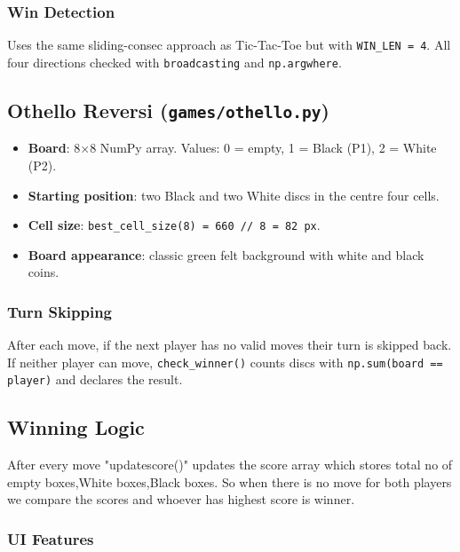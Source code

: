 \documentclass[12pt, letterpaper]{article}
\begin{document}
\subsubsection*{Win Detection}

Uses the same sliding-consec approach as Tic-Tac-Toe but with
\texttt{WIN\_LEN = 4}. All four directions checked with
\texttt{broadcasting} and \texttt{np.argwhere}.

\subsection{Othello Reversi (\texttt{games/othello.py})}

\begin{itemize}
    \item \textbf{Board}: 8$\times$8 NumPy array. Values: 0 = empty,
          1 = Black (P1), 2 = White (P2).
    \item \textbf{Starting position}: two Black and two White discs in the
          centre four cells.
    \item \textbf{Cell size}: \texttt{best\_cell\_size(8) = 660 // 8 = 82 px}.
    \item \textbf{Board appearance}: classic green felt background with white and black coins.
\end{itemize}


\subsubsection*{Turn Skipping}

After each move, if the next player has no valid moves their turn is skipped
back. If neither player can move, \texttt{check\_winner()} counts discs with
\texttt{np.sum(board == player)} and declares the result.

\subsection*{Winning Logic}

After every move "updatescore()" updates the score array which stores total no of empty boxes,White boxes,Black boxes. So when there is no move for both players we compare the scores and whoever has highest score is winner.

\subsubsection*{UI Features}
\end{document}
